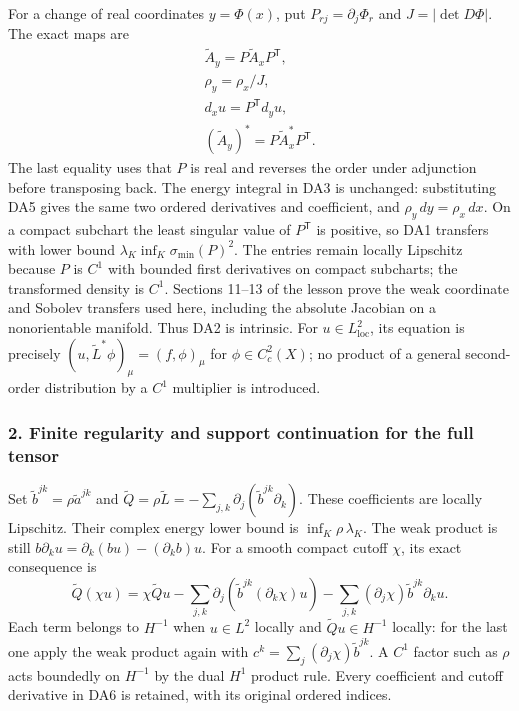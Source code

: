 \documentclass[
  11pt,
]{article}
\begin{document}
For a change of real coordinates \(y=\Phi(x)\), put
\(P_{rj}=\partial_j\Phi_r\) and \(J=|\det D\Phi|\). The exact maps are
\[
 \begin{gathered}
 \widetilde A_y=P\widetilde A_xP^{\mathsf T},\\
 \rho_y=\rho_x/J,\\
 d_xu=P^{\mathsf T}d_yu,\\
 (\widetilde A_y)^*=P\widetilde A_x^*P^{\mathsf T}.
 \end{gathered}\tag{DA5}
\] The last equality uses that \(P\) is real and reverses the order
under adjunction before transposing back. The energy integral in DA3 is
unchanged: substituting DA5 gives the same two ordered derivatives and
coefficient, and \(\rho_y\,dy=\rho_x\,dx\). On a compact subchart the
least singular value of \(P^{\mathsf T}\) is positive, so DA1 transfers
with lower bound \(\lambda_K\inf_K\sigma_{\min}(P)^2\). The entries
remain locally Lipschitz because \(P\) is \(C^1\) with bounded first
derivatives on compact subcharts; the transformed density is \(C^1\).
Sections 11--13 of the lesson prove the weak coordinate and Sobolev
transfers used here, including the absolute Jacobian on a nonorientable
manifold. Thus DA2 is intrinsic. For \(u\in L^2_{\mathrm{loc}}\), its
equation is precisely \((u,\widetilde L^*\phi)_\mu=(f,\phi)_\mu\) for
\(\phi\in C_c^2(X)\); no product of a general second-order distribution
by a \(C^1\) multiplier is introduced.

\subsubsection{2. Finite regularity and support continuation for the
full
tensor}\label{finite-regularity-and-support-continuation-for-the-full-tensor}

Set \(\widetilde b^{jk}=\rho\widetilde a^{jk}\) and
\(\widetilde Q=\rho\widetilde L=-\sum_{j,k}\partial_j(\widetilde b^{jk}\partial_k)\).
These coefficients are locally Lipschitz. Their complex energy lower
bound is \(\inf_K\rho\,\lambda_K\). The weak product is still
\(b\partial_k u=\partial_k(bu)-(\partial_kb)u\). For a smooth compact
cutoff \(\chi\), its exact consequence is \[
 \widetilde Q(\chi u)=\chi\widetilde Q u
 -\sum_{j,k}\partial_j(\widetilde b^{jk}(\partial_k\chi)u)
 -\sum_{j,k}(\partial_j\chi)\widetilde b^{jk}\partial_k u.\tag{DA6}
\] Each term belongs to \(H^{-1}\) when \(u\in L^2\) locally and
\(\widetilde Q u\in H^{-1}\) locally: for the last one apply the weak
product again with \(c^k=\sum_j(\partial_j\chi)\widetilde b^{jk}\). A
\(C^1\) factor such as \(\rho\) acts boundedly on \(H^{-1}\) by the dual
\(H^1\) product rule. Every coefficient and cutoff derivative in DA6 is
retained, with its original ordered indices.
\end{document}
